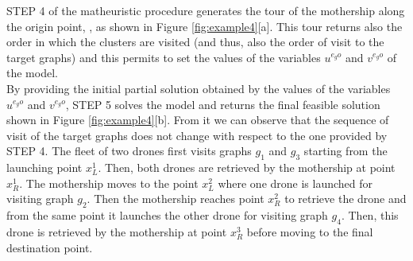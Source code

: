 \noindent
STEP 4 of the matheuristic procedure generates the tour of the mothership along the origin point, , as shown in Figure \ref{fig:example4}[a]. This tour returns also the order in which the clusters are visited (and thus, also the order of visit to the target graphs) and this permits to set the values of the variables $u^{e_{g}o}$ and $v^{e_{g}o}$ of the \AMD\space model.\\
\noindent 
By providing the initial partial solution obtained by the values of the variables $u^{e_{g}o}$ and $v^{e_{g}o}$, STEP 5 solves the \AMD\space model and returns the final feasible solution shown in Figure \ref{fig:example4}[b]. From it\RE{,} we can observe that the sequence of visit of the target graphs does not change with respect to the one provided by STEP 4. The fleet of two drones first visits  graphs $g_1$ and $g_3$ starting from the launching point $x^1_L$. Then, both drones are retrieved by the mothership at  point $x^1_R$. The mothership moves to the point $x^2_L$  where one drone is launched for visiting graph $g_2$. Then the mothership reaches  point $x^2_R$ to retrieve the drone and from the same point it launches the other drone for visiting graph $g_4$. Then, this drone is retrieved by the mothership at point $x^3_R$ before moving to the final destination point.



